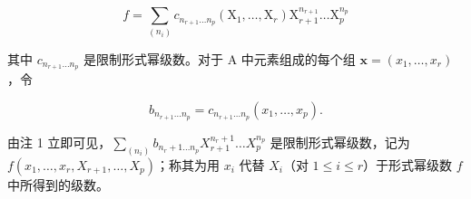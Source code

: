 \[
f = \sum_ {(n _ {i})} c _ {n _ {r + 1} \dots n _ {p}} (\mathrm{X} _ {1}, \dots , \mathrm{X} _ {r}) \mathrm{X} _ {r + 1} ^ {n _ {r + 1}} \dots \mathrm{X} _ {p} ^ {n _ {p}}
\]

其中 \(c_{n_{r+1}\ldots n_p}\) 是限制形式幂级数。对于 A 中元素组成的每个组 \(\mathbf{x} = (x_1, \ldots, x_r)\)，令

\[
b _ {n _ {r + 1} \dots n _ {p}} = c _ {n _ {r + 1} \dots n _ {p}} (x _ {1}, \dots , x _ {p}).
\]

由注 1 立即可见，\(\sum_{(n_i)} b_{n_r+1 \ldots n_p} X_{r+1}^{n_r+1} \ldots X_p^{n_p}\) 是限制形式幂级数，记为 \(f(x_1, \ldots, x_r, X_{r+1}, \ldots, X_p)\)；称其为用 \(x_i\) 代替 \(X_i\)（对 \(1 \leqslant i \leqslant r\)）于形式幂级数 \(f\) 中所得到的级数。


